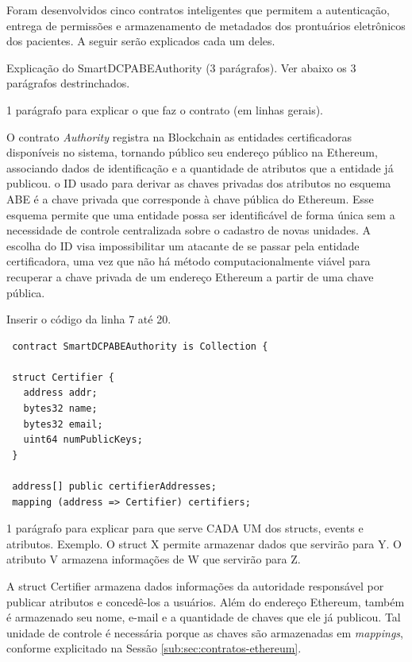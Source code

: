 \documentclass[a4paper,11pt]{article}
\begin{document}
Foram desenvolvidos cinco contratos inteligentes que permitem a autenticação, entrega de permissões e armazenamento de metadados dos prontuários eletrônicos dos pacientes. A seguir serão explicados cada um deles.

{\color{ForestGreen} Explicação do  SmartDCPABEAuthority (3 parágrafos). Ver abaixo os 3 parágrafos destrinchados.}

{\color{Magenta} 1 parágrafo para explicar o que faz o contrato (em linhas gerais).}

O contrato \emph{Authority} registra na Blockchain as entidades certificadoras disponíveis no sistema, tornando público seu endereço público na Ethereum, associando dados de identificação e a quantidade de atributos que a entidade já publicou.
o ID usado para derivar as chaves privadas dos atributos no esquema ABE é a chave privada que corresponde à chave pública do Ethereum.
Esse esquema permite que uma entidade possa ser identificável de forma única sem a necessidade de controle centralizada sobre o cadastro de novas unidades.
A escolha do ID visa impossibilitar um atacante de se passar pela entidade certificadora, uma vez que não há método computacionalmente viável para recuperar a chave privada de um endereço Ethereum a partir de uma chave pública.

{\color{Magenta} Inserir o código da linha 7 até 20.}

\begin{lstlisting}
 contract SmartDCPABEAuthority is Collection {

 struct Certifier {
   address addr;
   bytes32 name;
   bytes32 email;
   uint64 numPublicKeys;
 }

 address[] public certifierAddresses;
 mapping (address => Certifier) certifiers;
\end{lstlisting}

{\color{Magenta} 1 parágrafo para explicar para que serve CADA UM dos structs, events e atributos. Exemplo. O struct X permite armazenar dados que servirão para Y. O atributo V armazena informações de W que servirão para Z.}

A struct Certifier armazena dados informações da autoridade responsável por publicar atributos e concedê-los a usuários. Além do endereço Ethereum, também é armazenado seu nome, e-mail e a quantidade de chaves que ele já publicou.
Tal unidade de controle é necessária porque as chaves são armazenadas em \emph{mappings}, conforme explicitado na Sessão \ref{sub:sec:contratos-ethereum}.
\end{document}
